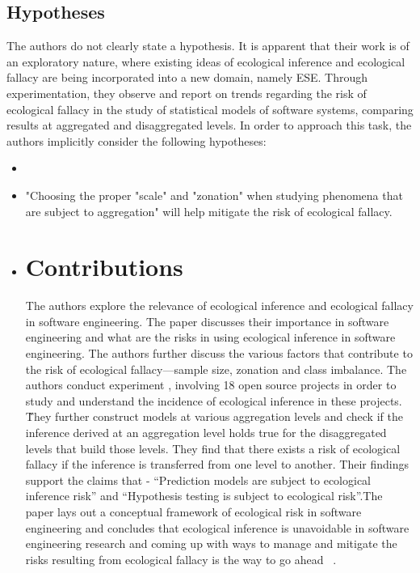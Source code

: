 \documentclass{acm_proc_article-sp}
\begin{document}
\subsection{Hypotheses}
\label{thesis-hypo}
The authors do not clearly state a hypothesis.  It is apparent that their work is of an exploratory nature, where existing ideas of ecological inference and ecological fallacy are being incorporated into a new domain, namely ESE.  Through experimentation, they observe and report on trends regarding the risk of ecological fallacy in the study of statistical models of software systems, comparing results at aggregated and disaggregated levels.  In order to approach this task, the authors implicitly consider the following hypotheses:
\begin{itemize}
	\item 
	\item "Choosing the proper "scale" and "zonation" when studying phenomena that are subject to aggregation" will help mitigate the risk of ecological fallacy.
	\item 

\section{Contributions}
\label{contrib}

The authors explore the relevance of ecological inference and ecological fallacy in software engineering. The paper discusses their importance in software engineering and 
what are the risks in using ecological inference in software engineering. The authors further discuss the various factors that contribute to the risk of ecological fallacy---sample size,
zonation and class imbalance. The authors conduct experiment , involving 18 open source projects in order to study and understand the incidence of ecological inference in these projects. \\
\~They further construct models at various aggregation levels and check if the inference derived at an aggregation level holds true for the disaggregated levels that build those levels. They find that there exists a risk of ecological fallacy if the inference is transferred from one level to another. Their findings support the claims that - ``Prediction models are subject to ecological inference risk'' and ``Hypothesis testing is subject to ecological risk''.The paper lays out a conceptual framework of ecological risk in software engineering and concludes that ecological inference is unavoidable in software engineering research and coming up with ways to manage and mitigate the risks resulting from ecological fallacy is the way to go ahead ~\cite{posnett:2011}.


\end{itemize}
\end{document}
